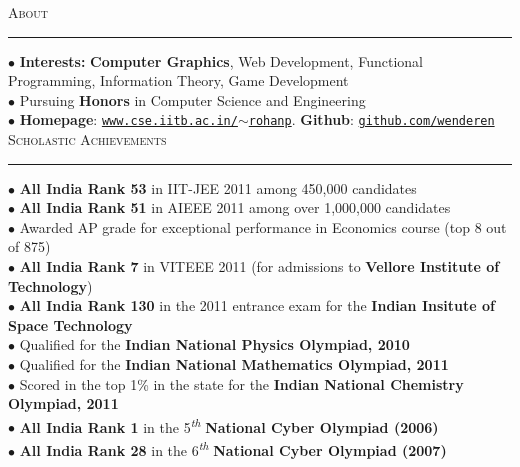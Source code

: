 \documentclass[a4paper,9pt]{article}
\begin{document}
\vspace*{4.6cm}


\large{\textsc{About}}\vspace{1.5pt}
\hrule\vspace{0.25cm}
\small
$\bullet$ \textbf{Interests:} \textbf{Computer Graphics}, Web Development, Functional Programming, Information Theory, Game Development\\
$\bullet$ Pursuing \textbf{Honors} in Computer Science and Engineering\\
$\bullet$ \textbf{Homepage}: \href{http://www.cse.iitb.ac.in/~rohanp}{\texttt{www.cse.iitb.ac.in/$\sim$rohanp}}. \textbf{Github}: \href{https://github.com/wenderen}{\texttt{github.com/wenderen}}\\

\large{\textsc{Scholastic Achievements}}\vspace{1.5pt}
\hrule\vspace{0.25cm}
\small
$\bullet$ \textbf{All India Rank 53} in IIT-JEE 2011 among 450,000 candidates\\
$\bullet$ \textbf{All India Rank 51} in AIEEE 2011 among over 1,000,000 candidates\\
$\bullet$ Awarded AP grade for exceptional performance in Economics course (top 8 out of 875)\\
$\bullet$ \textbf{All India Rank 7} in VITEEE 2011 (for admissions to \textbf{Vellore Institute of Technology})\\
$\bullet$ \textbf{All India Rank 130} in the 2011 entrance exam for the \textbf{Indian Insitute of Space Technology}\\
$\bullet$ Qualified for the \textbf{Indian National Physics Olympiad, 2010}\\
$\bullet$ Qualified for the \textbf{Indian National Mathematics Olympiad, 2011}\\
$\bullet$ Scored in the top 1\% in the state for the \textbf{Indian National Chemistry Olympiad, 2011}\\
$\bullet$ \textbf{All India Rank 1} in the 5\textsuperscript{\emph{th}} \textbf{National Cyber Olympiad (2006)}\\
$\bullet$ \textbf{All India Rank 28} in the 6\textsuperscript{\emph{th}} \textbf{National Cyber Olympiad (2007)}\\
\end{document}
